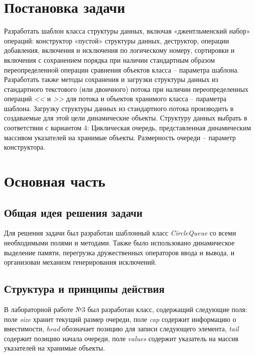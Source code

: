 \documentclass[a4paper,14pt]{article}
\begin{document}

\setcounter{page}{2} %

\renewcommand\contentsname{\centering {\normalsize Содержание}}
\tableofcontents
\newpage

\section*{Постановка задачи}

Разработать шаблон класса структуры данных, включая «джентльменский набор» операций: конструктор «пустой» структуры данных, деструктор, операции добавления, включения и исключения по логическому номеру, сортировки и включения с сохранением порядка при наличии стандартным образом переопределенной операции сравнения объектов класса – параметра шаблона. Разработать также методы сохранения и загрузки структуры данных из стандартного текстового (или двоичного) потока при
наличии переопределенных операций \textit{<<} и \textit{>>} для потока и объектов хранимого класса – параметра шаблона. Загрузку структуры данных из стандартного потока производить в создаваемые для этой цели динамические объекты. Структуру данных выбрать в соответствии с вариантом 4: Циклическая очередь, представленная динамическим массивом указателей на хранимые объекты. Размерность очереди – параметр конструктора.

\newpage

\section{Основная часть}
\subsection{Общая идея решения задачи}
Для решения задачи был разработан шаблонный класс \textit{CircleQueue} со всеми необходимыми полями и методами. Также было использовано динамическое выделение памяти, перегрузка дружественных операторов ввода и вывода, и организован механизм генерирования исключений.
\subsection{Структура и принципы действия}
В лабораторной работе №3 был разработан класс, содержащий следующие поля: поле \textit{size} хранит текущий размер очереди, поле \textit{cap} содержит информацию о вместимости, \textit{head} обозначает позицию для записи следующего элемента, \textit{tail} содержит позицию начала очереди, поле \textit{values} содержит указатель на массив указателей на хранимые объекты.
\end{document}
